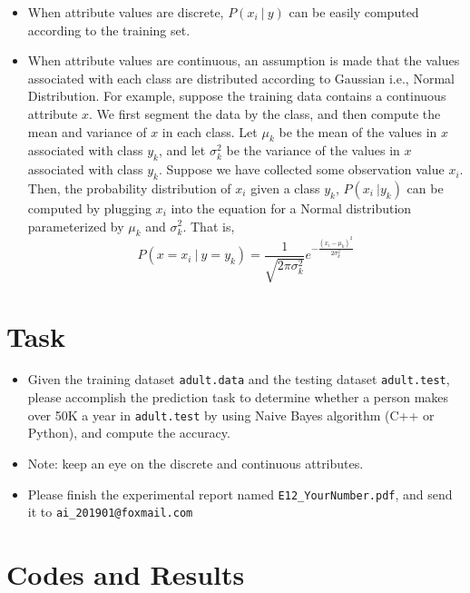 \documentclass[a4paper, 11pt]{article}
\begin{document}
\begin{itemize}
	\item When attribute values are discrete, $P(x_i\ |\ y)$ can be easily computed according to the training set.
	\item When attribute values are continuous, an assumption is made that the values associated with each class are distributed according to Gaussian i.e., Normal Distribution. For example, suppose the training data contains a continuous attribute $x$. We first segment the data by the class, and then compute the mean and variance of $x$ in each class. Let $\mu_k$ be the mean of the values in $x$ associated with class $y_k$, and let $\sigma_k^2$ be the variance of the values in $x$ associated with class $y_k$. Suppose we have collected some observation value $x_i$. Then, the probability distribution of $x_i$ given a class $y_k$, $P(x_i\ | y_k)$ can be computed by plugging $x_i$ into the equation for a Normal distribution parameterized by $\mu_k$ and $\sigma_k^2$. That is,
	$$P(x=x_i\ |\ y=y_k)=\frac{1}{\sqrt{2\pi\sigma_k^2}}e^{-\frac{(x_i-\mu_k)^2}{2\sigma_k^2}}$$
    
\end{itemize}

\section{Task}
\begin{itemize}
\item Given the training dataset \texttt{adult.data} and the testing dataset \texttt{adult.test}, please accomplish the prediction task to determine whether a person makes over 50K a year in \texttt{adult.test} by using Naive Bayes algorithm (C++ or Python), and compute the accuracy. 
\item Note: keep an eye on the discrete and continuous attributes.
\item Please finish the experimental report named \texttt{E12\_YourNumber.pdf}, and send it to \texttt{ai\_201901@foxmail.com}
\end{itemize}

\section{Codes and Results}


%
%
\end{document}
